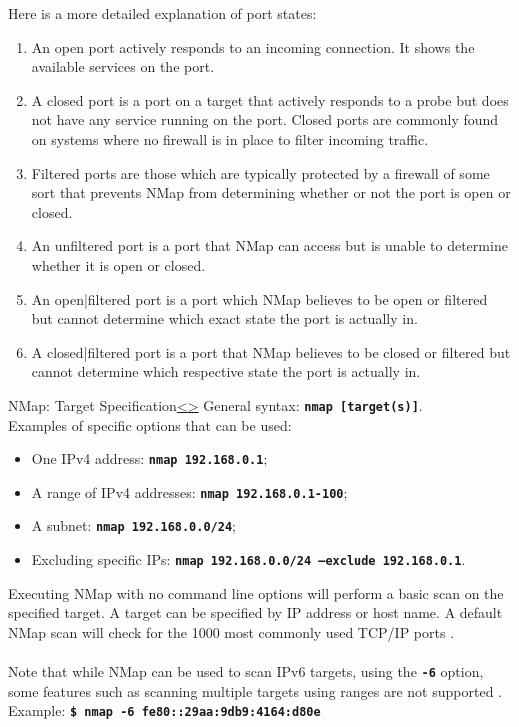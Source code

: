 \documentclass[12pt]{article}
\newcommand{\code}[1]{\texttt{\bfseries#1}}
\newenvironment{instructionblock}{\Large\bgroup}{\egroup}
\begin{document}
Here is a more detailed explanation of port states:
\begin{enumerate}
   \item An open port actively responds to an incoming connection. It shows the available services on the port. \cite{cookbook} 
   \item A closed port is a port on a target that actively responds to a probe but does not have any service running on the port. Closed ports are commonly found on systems where no firewall is in place to filter incoming traffic.\cite{cookbook} 
   \item Filtered ports are those which are typically protected by a firewall of some sort that prevents  NMap from determining whether or not the port is open or closed.\cite{cookbook} 
   \item An unfiltered port is a port that  NMap can access but is unable to determine whether it is open or closed.\cite{cookbook} 
   \item An open|filtered port is a port which  NMap believes to be open or filtered but cannot determine which exact state the port is actually in.\cite{cookbook} 
   \item A closed|filtered port is a port that  NMap believes to be closed or filtered but cannot determine which respective state the port is actually in.\cite{cookbook} 
\end{enumerate}

\pagebreak
\begin{slide}{ NMap: Target Specification}{\hyperref[slide 4]{\textless}\hyperref[slide 6]{\textgreater}}
   \begin{instructionblock}
General syntax: \code{nmap [target(s)]}. \\ Examples of specific options that can be used:
      \begin{itemize}
\item One IPv4 address: \code{nmap 192.168.0.1};
\item A range of IPv4 addresses: \code{nmap 192.168.0.1-100};
\item A subnet: \code{nmap 192.168.0.0/24};
\item Excluding specific IPs: \code{nmap 192.168.0.0/24 --exclude 192.168.0.1}.
      \end{itemize}
   \end{instructionblock}
\end{slide}

Executing  NMap with no command line options will perform a basic scan on the specified target. A target can be specified by IP address or host name. A default  NMap scan will check for the 1000 most commonly used TCP/IP ports \cite{cookbook}. 
\\ \\
Note that while  NMap can be used to scan IPv6 targets, using the \code{-6} option, some features such as scanning multiple targets using ranges are not supported \cite{cookbook}.\\
Example: \code{\$ nmap -6 fe80::29aa:9db9:4164:d80e}
\\ \\
\end{document}
